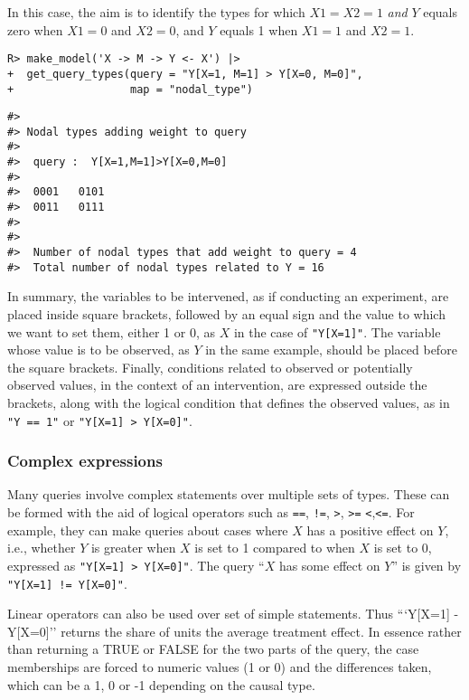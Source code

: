 \documentclass[
  11pt,
  article]{jss}
\begin{document}
In this case, the aim is to identify the types for which \(X1=X2=1\)
\emph{and} \(Y\) equals zero when \(X1 = 0\) and \(X2 = 0\), and \(Y\)
equals 1 when \(X1 = 1\) and \(X2 = 1\).

\begin{verbatim}
R> make_model('X -> M -> Y <- X') |> 
+  get_query_types(query = "Y[X=1, M=1] > Y[X=0, M=0]", 
+                  map = "nodal_type")
\end{verbatim}

\begin{verbatim}
#> 
#> Nodal types adding weight to query
#> 
#>  query :  Y[X=1,M=1]>Y[X=0,M=0] 
#> 
#>  0001   0101
#>  0011   0111
#> 
#> 
#>  Number of nodal types that add weight to query = 4
#>  Total number of nodal types related to Y = 16
\end{verbatim}

In summary, the variables to be intervened, as if conducting an
experiment, are placed inside square brackets, followed by an equal sign
and the value to which we want to set them, either 1 or 0, as \(X\) in
the case of \texttt{"Y{[}X=1{]}"}. The variable whose value is to be
observed, as \(Y\) in the same example, should be placed before the
square brackets. Finally, conditions related to observed or potentially
observed values, in the context of an intervention, are expressed
outside the brackets, along with the logical condition that defines the
observed values, as in \texttt{"Y\ ==\ 1"} or
\texttt{"Y{[}X=1{]}\ \textgreater{}\ Y{[}X=0{]}"}.

\hypertarget{complex-expressions}{%
\subsubsection{Complex expressions}\label{complex-expressions}}

Many queries involve complex statements over multiple sets of types.
These can be formed with the aid of logical operators such as
\texttt{==}, \texttt{!=}, \texttt{\textgreater{}},
\texttt{\textgreater{}=} \texttt{\textless{}},\texttt{\textless{}=}. For
example, they can make queries about cases where \(X\) has a positive
effect on \(Y\), i.e., whether \(Y\) is greater when \(X\) is set to 1
compared to when \(X\) is set to 0, expressed as
\texttt{"Y{[}X=1{]}\ \textgreater{}\ Y{[}X=0{]}"}. The query ``\(X\) has
some effect on \(Y\)'' is given by
\texttt{"Y{[}X=1{]}\ !=\ Y{[}X=0{]}"}.

Linear operators can also be used over set of simple statements. Thus
```Y{[}X=1{]} - Y{[}X=0{]}'' returns the share of units the average
treatment effect. In essence rather than returning a TRUE or FALSE for
the two parts of the query, the case memberships are forced to numeric
values (1 or 0) and the differences taken, which can be a 1, 0 or -1
depending on the causal type.
\end{document}
